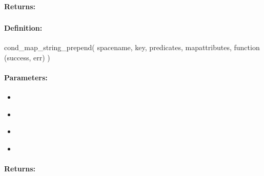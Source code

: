 \paragraph{Returns:}


\pagebreak
\subsubsection{}
\label{api:nodejs:cond_map_string_prepend}


\paragraph{Definition:}
\begin{javascriptcode}
cond_map_string_prepend(
        spacename, key, predicates, mapattributes, function (success, err) {})
\end{javascriptcode}
\paragraph{Parameters:}
\begin{itemize}[noitemsep]
\item {}\\

\item {}\\

\item {}\\

\item {}\\

\end{itemize}

\paragraph{Returns:}


\pagebreak
\subsubsection{}
\label{api:nodejs:map_string_append}


